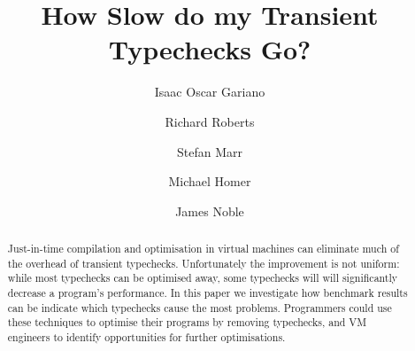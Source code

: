 \documentclass[sigplan,10pt,review,screen]{acmart}\settopmatter{printfolios=true}
\begin{document}
\title{How Slow do my Transient Typechecks Go?}

\author{Isaac Oscar Gariano}

\author{Richard Roberts}


\author{Stefan Marr}


\author{Michael Homer}



\author{James Noble}




\begin{abstract}
Just-in-time compilation and optimisation in virtual machines can
eliminate much of the overhead of transient typechecks.  Unfortunately
the improvement is not uniform: while most typechecks can be optimised
away, some typechecks will will significantly decrease a program's
performance.  In this paper we investigate how benchmark results can be
indicate which typechecks cause the most problems. Programmers could
use these techniques to optimise their programs by removing
typechecks, and VM engineers to identify opportunities for further
optimisations.   
\end{abstract}


\begin{CCSXML}
\end{CCSXML}

\end{document}
